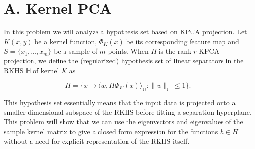 \documentclass{article}
\begin{document}
\section*{A. Kernel PCA}

In this problem we will analyze a hypothesis set based on KPCA projection. Let $K(x,y)$ be a kernel function, $\Phi_{K}(x)$ be its corresponding feature map and $S =\{ x_{1}, \dots, x_{m}\}$ be a sample of $m$ points. When $\Pi$ is the rank-$r$ KPCA projection, we define the (regularized) hypothesis set of linear separators in the RKHS $\mathbb{H}$ of kernel $K$ as

\begin{equation}
    H = \bigg\{x \to \langle w , \Pi \Phi_{K}(x)\rangle_{\mathbb{H}} : \lVert w \rVert_{\mathbb{H}} \leq 1 \bigg\}.
\end{equation}

This hypothesis set essentially means that the input data is projected onto a smaller dimensional subspace of the RKHS before fitting a separation hyperplane. This problem will show that we can use the eigenvectors and eigenvalues of the sample kernel matrix to give a closed form expression for the functions $h \in H$ without a need for explicit representation of the RKHS itself.
\end{document}
